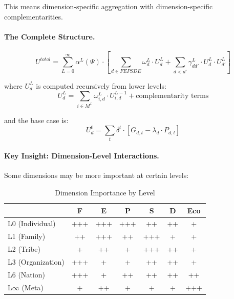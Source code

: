 This means dimension-specific aggregation with dimension-specific complementarities.

\paragraph{The Complete Structure.}

\begin{tcolorbox}[colback=green!5!white, colframe=green!75!black, title=AAA $\times$ C: Complete Utility Structure]
\begin{equation}
\boxed{
U^{total} = \sum_{L=0}^{\infty} \alpha^L(\Psi) \cdot \left[ \sum_{d \in FEPSDE} \omega^L_d \cdot U^L_d + \sum_{d < d'} \gamma^L_{dd'} \cdot U^L_d \cdot U^L_{d'} \right]
}
\end{equation}

where $U^L_d$ is computed recursively from lower levels:
\begin{equation}
U^L_d = \sum_{i \in M^L} \omega^L_{i,d} \cdot U^{L-1}_{i,d} + \text{complementarity terms}
\end{equation}

and the base case is:
\begin{equation}
U^0_d = \sum_t \delta^t \cdot [G_{d,t} - \lambda_d \cdot P_{d,t}]
\end{equation}
\end{tcolorbox}

\paragraph{Key Insight: Dimension-Level Interactions.}

Some dimensions may be more important at certain levels:

\begin{table}[htbp]
\centering
\caption{Dimension Importance by Level}
\label{tab:aaa-dimension-level}
\renewcommand{\arraystretch}{1.2}
\small
\begin{tabular}{@{}lcccccc@{}}
\toprule
& \textbf{F} & \textbf{E} & \textbf{P} & \textbf{S} & \textbf{D} & \textbf{Eco} \\
\midrule
L0 (Individual) & +++ & +++ & +++ & ++ & ++ & + \\
L1 (Family) & ++ & +++ & ++ & +++ & + & + \\
L2 (Tribe) & + & ++ & + & +++ & ++ & + \\
L3 (Organization) & +++ & + & + & ++ & ++ & + \\
L6 (Nation) & +++ & + & ++ & ++ & ++ & ++ \\
L$\infty$ (Meta) & + & ++ & + & + & + & +++ \\
\bottomrule
\end{tabular}
\end{table}

